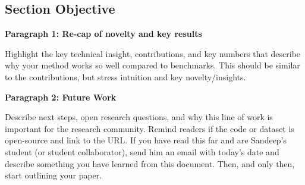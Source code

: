 \subsection{Section Objective}

\textbf{Paragraph 1: Re-cap of novelty and key results}

Highlight the key technical insight, contributions, and key numbers that describe why your method works so well compared to benchmarks. This should be similar to the contributions, but stress intuition and key novelty/insights. 

\textbf{Paragraph 2: Future Work}

Describe next steps, open research questions, and why this line of work is important for the research community. Remind readers if the code or dataset is open-source and link to the URL. If you have read this far and are Sandeep's student (or student collaborator), send him an email with today's date and describe something you have learned from this document.
Then, and only then, start outlining your paper. 

